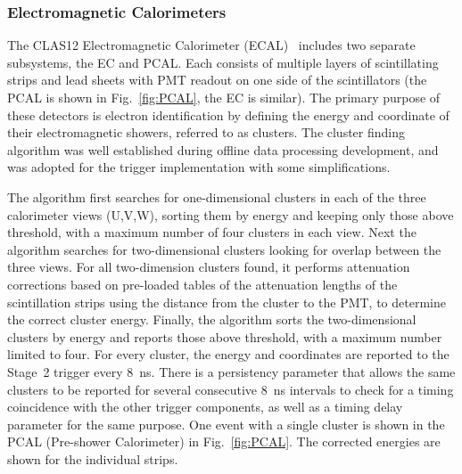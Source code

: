 \subsubsection{Electromagnetic Calorimeters}
\label{sec:ECAL}

The CLAS12 Electromagnetic Calorimeter (ECAL)~\cite{ec-ref} includes two separate subsystems, the EC
and PCAL. Each consists of multiple layers of scintillating strips and lead sheets with PMT readout on one side
of the scintillators (the PCAL is shown in Fig.~\ref{fig:PCAL}, the EC is similar). The primary purpose of these
detectors is electron identification by defining the energy and coordinate of their electromagnetic showers,
referred to as clusters. The cluster finding algorithm was well established during offline data processing
development, and was adopted for the trigger implementation with some simplifications.

The algorithm first searches for one-dimensional clusters in each of the three calorimeter views (U,V,W),
sorting them by energy and keeping only those above threshold, with a maximum number of four clusters in
each view. Next the algorithm searches for two-dimensional clusters looking for overlap between the three
views. For all two-dimension clusters found, it performs attenuation corrections based on pre-loaded tables
of the attenuation lengths of the scintillation strips using the distance from the cluster to the PMT, to
determine the correct cluster energy. Finally, the algorithm sorts the two-dimensional clusters by energy and
reports those above threshold, with a maximum number limited to four. For every cluster, the energy and
coordinates are reported to the Stage~2 trigger every 8~ns. There is a persistency parameter that allows the
same clusters to be reported for several consecutive 8~ns intervals to check for a timing coincidence with the
other trigger components, as well as a timing delay parameter for the same purpose. One event with a single
cluster is shown in the PCAL (Pre-shower Calorimeter) in Fig.~\ref{fig:PCAL}. The corrected energies are
shown for the individual strips.

